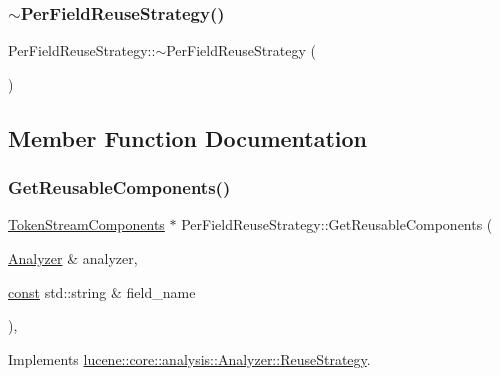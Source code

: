 \subsubsection{\texorpdfstring{$\sim$\+Per\+Field\+Reuse\+Strategy()}{~PerFieldReuseStrategy()}}
{\footnotesize\ttfamily Per\+Field\+Reuse\+Strategy\+::$\sim$\+Per\+Field\+Reuse\+Strategy (\begin{DoxyParamCaption}{ }\end{DoxyParamCaption})\hspace{0.3cm}{\ttfamily [virtual]}}



\subsection{Member Function Documentation}
\mbox{\label{classlucene_1_1core_1_1analysis_1_1PerFieldReuseStrategy_ab0d86155823842bb28e43bbbec7c06d3}} 
\subsubsection{\texorpdfstring{Get\+Reusable\+Components()}{GetReusableComponents()}}
{\footnotesize\ttfamily \mbox{\hyperlink{classlucene_1_1core_1_1analysis_1_1TokenStreamComponents}{Token\+Stream\+Components}} $\ast$ Per\+Field\+Reuse\+Strategy\+::\+Get\+Reusable\+Components (\begin{DoxyParamCaption}\item[{\mbox{\hyperlink{classlucene_1_1core_1_1analysis_1_1Analyzer}{Analyzer}} \&}]{analyzer,  }\item[{\mbox{\hyperlink{ZlibCrc32_8h_a2c212835823e3c54a8ab6d95c652660e}{const}} std\+::string \&}]{field\+\_\+name }\end{DoxyParamCaption})\hspace{0.3cm}{\ttfamily [override]}, {\ttfamily [virtual]}}



Implements \mbox{\hyperlink{classlucene_1_1core_1_1analysis_1_1Analyzer_1_1ReuseStrategy_ab180767950f392037e8ddf78c2f11f95}{lucene\+::core\+::analysis\+::\+Analyzer\+::\+Reuse\+Strategy}}.

